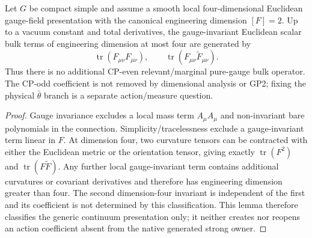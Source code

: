 \documentclass[12pt,a4paper]{article}
\begin{document}
\begin{lemma}[Dimension-\texorpdfstring{\(\le4\)}{<=4} pure-gauge local-term classification]
\label{p12:lem:no-hidden-relevant-gauge-branch}
Let \(G\) be compact simple and assume a smooth local four-dimensional Euclidean gauge-field presentation with the canonical engineering dimension \([F]=2\).  Up to a vacuum constant and total derivatives, the gauge-invariant Euclidean scalar bulk terms of engineering dimension at most four are generated by
\[
\operatorname{tr}(F_{\mu\nu}F_{\mu\nu}),
\qquad
\operatorname{tr}(F_{\mu\nu}\widetilde F_{\mu\nu}).
\]
Thus there is no additional CP-even relevant/marginal pure-gauge bulk operator.  The CP-odd coefficient is not removed by dimensional analysis or GP2; fixing the physical \(\bar\theta\) branch is a separate action/measure question.
\end{lemma}
\begin{proof}
Gauge invariance excludes a local mass term \(A_\mu A_\mu\) and non-invariant bare polynomials in the connection.  Simplicity/tracelessness exclude a gauge-invariant term linear in \(F\).  At dimension four, two curvature tensors can be contracted with either the Euclidean metric or the orientation tensor, giving exactly \(\operatorname{tr}(F^2)\) and \(\operatorname{tr}(F\widetilde F)\).  Any further local gauge-invariant term contains additional curvatures or covariant derivatives and therefore has engineering dimension greater than four.  The second dimension-four invariant is independent of the first and its coefficient is not determined by this classification.  This lemma therefore classifies the generic continuum presentation only; it neither creates nor reopens an action coefficient absent from the native generated strong owner.
\end{proof}
\end{document}

